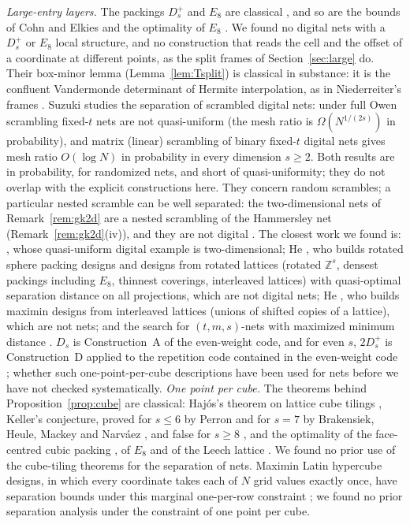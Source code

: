 \documentclass[11pt]{amsart}
\theoremstyle{definition}
\theoremstyle{plain}
\newcommand{\Z}{\mathbb{Z}}
\begin{document}
\emph{Large-entry layers.} The packings $D_s^+$ and $E_8$ are classical \cite{CS99}, and so are the bounds of Cohn and Elkies \cite{CE03} and the optimality of $E_8$ \cite{Via17}. We found no digital nets with a $D_s^+$ or $E_8$ local structure, and no construction that reads the cell and the offset of a coordinate at different points, as the split frames of Section~\ref{sec:large} do. Their box-minor lemma (Lemma~\ref{lem:Tsplit}) is classical in substance: it is the confluent Vandermonde determinant of Hermite interpolation, as in Niederreiter's frames \cite[Thm.~6.2]{Nie87}. Suzuki \cite{Suz26} studies the separation of scrambled digital nets: under full Owen scrambling fixed-$t$ nets are not quasi-uniform (the mesh ratio is $\Omega(N^{1/(2s)})$ in probability), and matrix (linear) scrambling of binary fixed-$t$ digital nets gives mesh ratio $O(\log N)$ in probability in every dimension $s\ge2$. Both results are in probability, for randomized nets, and short of quasi-uniformity; they do not overlap with the explicit constructions here. They concern random scrambles; a particular nested scramble can be well separated: the two-dimensional nets of Remark~\ref{rem:gk2d} are a nested scrambling \cite{Owe95} of the Hammersley net (Remark~\ref{rem:gk2d}(iv)), and they are not digital \cite{GK09,Rud26}. The closest work we found is: \cite{DGS2}, whose quasi-uniform digital example is two-dimensional; He \cite{He17,He21}, who builds rotated sphere packing designs and designs from rotated lattices (rotated $\Z^s$, densest packings including $E_8$, thinnest coverings, interleaved lattices) with quasi-optimal separation distance on all projections, which are not digital nets; He \cite{He19}, who builds maximin designs from interleaved lattices (unions of shifted copies of a lattice), which are not nets; and the search for $(t,m,s)$-nets with maximized minimum distance \cite{GHSK08,GK09}. $D_s$ is Construction~A of the even-weight code, and for even $s$, $2D_s^+$ is Construction~D applied to the repetition code contained in the even-weight code \cite{BS83}; whether such one-point-per-cube descriptions have been used for nets before we have not checked systematically.
\emph{One point per cube.} The theorems behind Proposition~\ref{prop:cube} are classical: Haj\'os's theorem on lattice cube tilings \cite{Haj42}, Keller's conjecture, proved for $s\le6$ by Perron \cite{Per40} and for $s=7$ by Brakensiek, Heule, Mackey and Narv\'aez \cite{BHMN20}, and false for $s\ge8$ \cite{LS92,Mac02}, and the optimality of the face-centred cubic packing \cite{Hal05}, of $E_8$ \cite{Via17} and of the Leech lattice \cite{CKMRV17}. We found no prior use of the cube-tiling theorems for the separation of nets. Maximin Latin hypercube designs, in which every coordinate takes each of $N$ grid values exactly once, have separation bounds under this marginal one-per-row constraint \cite{vDHHM07,vDRH09}; we found no prior separation analysis under the constraint of one point per cube.
\end{document}
